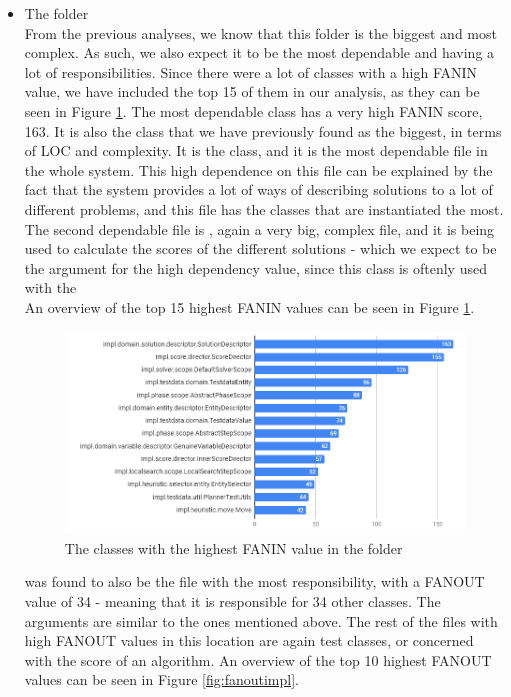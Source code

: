 \begin{itemize}
        
        \item The  folder\\
        From the previous analyses, we know that this folder is the biggest and most complex. As such, we also expect it to be the most dependable and having a lot of responsibilities. Since there were a lot of classes with a high FANIN value, we have included the top 15 of them in our analysis, as they can be seen in Figure \ref{fig:faninimpl}. The most dependable class has a very high FANIN score, 163. It is also the class that we have previously found as the biggest, in terms of LOC and complexity. It is the  class, and it is the most dependable file in the whole system. This high dependence on this file can be explained by the fact that the system provides a lot of ways of describing solutions to a lot of different problems, and this file has the classes that are instantiated the most. \\
        The second dependable file is , again a very big, complex file, and it is being used to calculate the scores of the different solutions - which we expect to be the argument for the high dependency value, since this class is oftenly used with the  \\
        An overview of the top 15 highest FANIN values can be seen in Figure \ref{fig:faninimpl}.
        \begin{figure}[H]
            \centering
            \includegraphics[scale=0.8]{figures/step4/step4.2/FANIN_impl.PNG}
            \caption{The classes with the highest FANIN value in the  folder}
            \label{fig:faninimpl}
        \end{figure}
         was found to also be the file with the most responsibility, with a FANOUT value of 34 - meaning that it is responsible for 34 other classes. The arguments are similar to the ones mentioned above. The rest of the files with high FANOUT values in this location are again test classes, or concerned with the score of an algorithm. An overview of the top 10 highest FANOUT values can be seen in Figure \ref{fig:fanoutimpl}.

\end{itemize}
